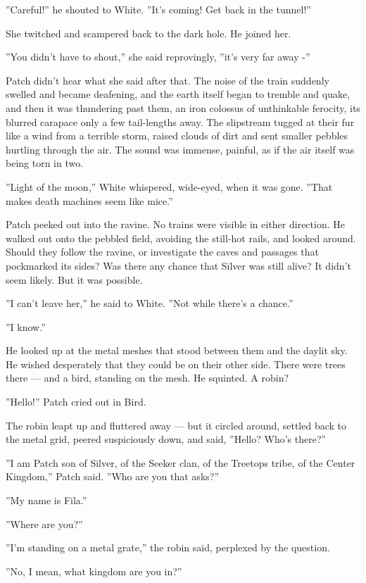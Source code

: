 \documentclass[12pt]{book}
\begin{document}
''Careful!'' he shouted to White. ''It's coming! Get back in the tunnel!''

She twitched and scampered back to the dark hole. He joined her.

''You didn't have to shout,'' she said reprovingly, ''it's very far away -''

Patch didn't hear what she said after that. The noise of the train suddenly swelled and became deafening, and the earth itself began to tremble and quake, and then it was thundering past them, an iron colossus of unthinkable ferocity, its blurred carapace only a few tail-lengths away. The slipstream tugged at their fur like a wind from a terrible storm, raised clouds of dirt and sent smaller pebbles hurtling through the air. The sound was immense, painful, as if the air itself was being torn in two.

''Light of the moon,'' White whispered, wide-eyed, when it was gone. ''That makes death machines seem like mice.''

Patch peeked out into the ravine. No trains were visible in either direction. He walked out onto the pebbled field, avoiding the still-hot rails, and looked around. Should they follow the ravine, or investigate the caves and passages that pockmarked its sides? Was there any chance that Silver was still alive? It didn't seem likely. But it was possible.

''I can't leave her,'' he said to White. ''Not while there's a chance.''

''I know.''

He looked up at the metal meshes that stood between them and the daylit sky. He wished desperately that they could be on their other side. There were trees there ---
and a bird, standing on the mesh. He squinted. A robin?

''Hello!'' Patch cried out in Bird.

The robin leapt up and fluttered away ---
but it circled around, settled back to the metal grid, peered suspiciously down, and said, ''Hello? Who's there?''

''I am Patch son of Silver, of the Seeker clan, of the Treetops tribe, of the Center Kingdom,'' Patch said. ''Who are you that asks?''

''My name is Fila.''

''Where are you?''

''I'm standing on a metal grate,'' the robin said, perplexed by the question.

''No, I mean, what kingdom are you in?''
\end{document}
